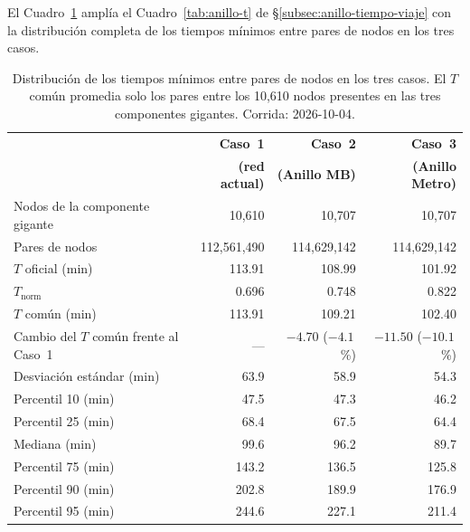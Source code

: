 El Cuadro~\ref{tab:anx-g-t-extendido} amplía el Cuadro~\ref{tab:anillo-t} de
§\ref{subsec:anillo-tiempo-viaje} con la distribución completa de los tiempos
mínimos entre pares de nodos en los tres casos.

\begin{table}[H]
    \centering
    \caption[Distribución del tiempo de viaje en los tres casos]{%
    Distribución de los tiempos mínimos entre pares de nodos en los tres
    casos. El $T$ común promedia solo los pares entre los 10,610 nodos
    presentes en las tres componentes gigantes. Corrida: 2026-10-04.}
    \label{tab:anx-g-t-extendido}
    \small
    \begin{tabular}{|p{6.4cm}|r|r|r|}
        \hline
        & \textbf{Caso~1} & \textbf{Caso~2} & \textbf{Caso~3} \\
        & \textbf{(red actual)} & \textbf{(Anillo MB)} &
          \textbf{(Anillo Metro)} \\
        \hline
        Nodos de la componente gigante          & 10,610 & 10,707 & 10,707 \\
        Pares de nodos                          & 112,561,490 & 114,629,142 &
            114,629,142 \\
        $T$ oficial (min)                       & 113.91 & 108.99 & 101.92 \\
        $T_{\text{norm}}$                       & 0.696  & 0.748  & 0.822 \\
        \hline
        $T$ común (min)                         & 113.91 & 109.21 & 102.40 \\
        Cambio del $T$ común frente al Caso~1   & ---    & $-4.70$ ($-4.1$\,\%) &
            $-11.50$ ($-10.1$\,\%) \\
        \hline
        Desviación estándar (min)               & 63.9   & 58.9   & 54.3 \\
        Percentil 10 (min)                      & 47.5   & 47.3   & 46.2 \\
        Percentil 25 (min)                      & 68.4   & 67.5   & 64.4 \\
        Mediana (min)                           & 99.6   & 96.2   & 89.7 \\
        Percentil 75 (min)                      & 143.2  & 136.5  & 125.8 \\
        Percentil 90 (min)                      & 202.8  & 189.9  & 176.9 \\
        Percentil 95 (min)                      & 244.6  & 227.1  & 211.4 \\

\end{tabular}
\end{table}
